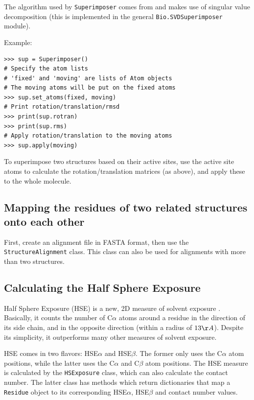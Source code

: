 \documentclass{report}
\begin{document}
The algorithm used by \texttt{Superimposer} comes from \cite[Golub \& Van Loan]{golub1989} and makes use of singular value decomposition (this is implemented in the general \texttt{Bio.SVDSuperimposer} module).

Example:

\begin{verbatim}
>>> sup = Superimposer()
# Specify the atom lists
# 'fixed' and 'moving' are lists of Atom objects
# The moving atoms will be put on the fixed atoms
>>> sup.set_atoms(fixed, moving)
# Print rotation/translation/rmsd
>>> print(sup.rotran)
>>> print(sup.rms) 
# Apply rotation/translation to the moving atoms
>>> sup.apply(moving)
\end{verbatim}

To superimpose two structures based on their active sites, use the active site atoms to calculate the rotation/translation matrices (as above), and apply these to the whole molecule.

\subsection{Mapping the residues of two related structures onto each other}

First, create an alignment file in FASTA format, then use the \texttt{StructureAlignment}
class. This class can also be used for alignments with more than two
structures.

\subsection{Calculating the Half Sphere Exposure}

Half Sphere Exposure (HSE) is a new, 2D measure of solvent exposure
\cite{hamelryck2005}.
Basically, it counts the number of C$\alpha$ atoms around a residue
in the direction of its side chain, and in the opposite direction
(within a radius of $13 \AA$). Despite its simplicity, it outperforms
many other measures of solvent exposure.

HSE comes in two flavors: HSE$\alpha$ and HSE$\beta$. The former
only uses the C$\alpha$ atom positions, while the latter uses the
C$\alpha$ and C$\beta$ atom positions. The HSE measure is calculated
by the \texttt{HSExposure} class, which can also calculate the contact
number. The latter class has methods which return dictionaries that
map a \texttt{Residue} object to its corresponding HSE$\alpha$, HSE$\beta$
and contact number values.
\end{document}
